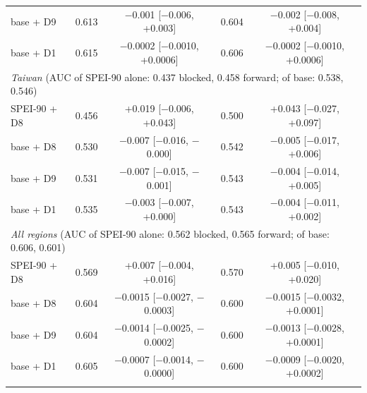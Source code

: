 \begin{table}[tbp]
\begin{tabular*}{\textwidth}{@{\extracolsep\fill}lcccc}
\quad base + D9 & 0.613 & $-$0.001 [$-$0.006, +0.003] & 0.604 & $-$0.002 [$-$0.008, +0.004] \\
\quad base + D1 & 0.615 & $-$0.0002 [$-$0.0010, +0.0006] & 0.606 & $-$0.0002 [$-$0.0010, +0.0006] \\
\midrule
\multicolumn{5}{l}{\textit{Taiwan} (AUC of SPEI-90 alone: 0.437 blocked, 0.458 forward; of base: 0.538, 0.546)}\\
\quad SPEI-90 + D8 & 0.456 & +0.019 [$-$0.006, +0.043] & 0.500 & +0.043 [$-$0.027, +0.097] \\
\quad base + D8 & 0.530 & $-$0.007 [$-$0.016, $-$0.000] & 0.542 & $-$0.005 [$-$0.017, +0.006] \\
\quad base + D9 & 0.531 & $-$0.007 [$-$0.015, $-$0.001] & 0.543 & $-$0.004 [$-$0.014, +0.005] \\
\quad base + D1 & 0.535 & $-$0.003 [$-$0.007, +0.000] & 0.543 & $-$0.004 [$-$0.011, +0.002] \\
\midrule
\multicolumn{5}{l}{\textit{All regions} (AUC of SPEI-90 alone: 0.562 blocked, 0.565 forward; of base: 0.606, 0.601)}\\
\quad SPEI-90 + D8 & 0.569 & +0.007 [$-$0.004, +0.016] & 0.570 & +0.005 [$-$0.010, +0.020] \\
\quad base + D8 & 0.604 & $-$0.0015 [$-$0.0027, $-$0.0003] & 0.600 & $-$0.0015 [$-$0.0032, +0.0001] \\
\quad base + D9 & 0.604 & $-$0.0014 [$-$0.0025, $-$0.0002] & 0.600 & $-$0.0013 [$-$0.0028, +0.0001] \\
\quad base + D1 & 0.605 & $-$0.0007 [$-$0.0014, $-$0.0000] & 0.600 & $-$0.0009 [$-$0.0020, +0.0002] \\
\botrule
\end{tabular*}
\end{table}
